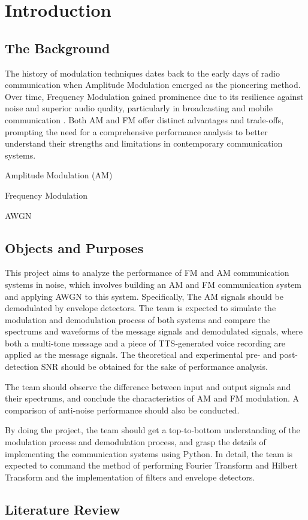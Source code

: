 \documentclass[../ECE459FinalProjectReport.tex]{subfiles}
\begin{document}
\chapter{Introduction}
\section{The Background}
The history of modulation techniques dates back to the early days of radio communication when Amplitude Modulation emerged as the pioneering method. Over time, Frequency Modulation gained prominence due to its resilience against noise and superior audio quality, particularly in broadcasting and mobile communication \cite[p. 152]{haykinIntroductionAnalogDigital2007}. Both AM and FM offer distinct advantages and trade-offs, prompting the need for a comprehensive performance analysis to better understand their strengths and limitations in contemporary communication systems.

Amplitude Modulation (AM) 

Frequency Modulation 

AWGN %


\section{Objects and Purposes}
This project aims to analyze the performance of FM and AM communication systems in noise, which involves building an AM and FM communication system and applying AWGN to this system. Specifically, The AM signals should be demodulated by envelope detectors. The team is expected to simulate the modulation and demodulation process of both systems and compare the spectrums and waveforms of the message signals and demodulated signals, where both a multi-tone message and a piece of TTS-generated voice recording are applied as the message signals. The theoretical and experimental pre- and post-detection SNR should be obtained for the sake of performance analysis.

The team should observe the difference between input and output signals and their spectrums, and conclude the characteristics of AM and FM modulation. A comparison of anti-noise performance should also be conducted.

By doing the project, the team should get a top-to-bottom understanding of the modulation process and demodulation process, and grasp the details of implementing the communication systems using Python. In detail, the team is expected to command the method of performing Fourier Transform and Hilbert Transform and the implementation of filters and envelope detectors.

\section{Literature Review}
\end{document}
